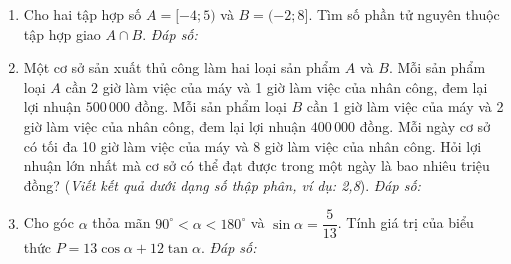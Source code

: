 \documentclass[12pt,a4paper]{article}
\newcommand{\answerbox}{\hfill\textit{Đáp số:}\ \fbox{\rule{0pt}{12pt}\hspace{2.2cm}}}
\begin{document}
\begin{enumerate}[resume]
\begin{minipage}[t]{0.38\linewidth}
\end{minipage}

\item Cho hai tập hợp số $A = [-4; 5)$ và $B = (-2; 8]$. Tìm số phần tử nguyên thuộc tập hợp giao $A \cap B$.
\answerbox

\item Một cơ sở sản xuất thủ công làm hai loại sản phẩm $A$ và $B$. Mỗi sản phẩm loại $A$ cần 2 giờ làm việc của máy và 1 giờ làm việc của nhân công, đem lại lợi nhuận $500\,000$ đồng. Mỗi sản phẩm loại $B$ cần 1 giờ làm việc của máy và 2 giờ làm việc của nhân công, đem lại lợi nhuận $400\,000$ đồng. Mỗi ngày cơ sở có tối đa 10 giờ làm việc của máy và 8 giờ làm việc của nhân công. Hỏi lợi nhuận lớn nhất mà cơ sở có thể đạt được trong một ngày là bao nhiêu triệu đồng? (\textit{Viết kết quả dưới dạng số thập phân, ví dụ: 2,8}).
\answerbox

\item Cho góc $\alpha$ thỏa mãn $90^\circ < \alpha < 180^\circ$ và $\sin \alpha = \dfrac{5}{13}$. Tính giá trị của biểu thức $P = 13\cos \alpha + 12\tan \alpha$.
\answerbox
\end{enumerate}
\end{document}
